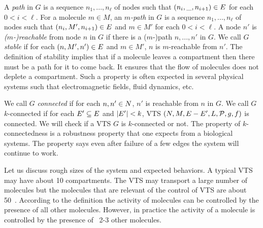 %

\vspace{0.2cm}
\noindent
A {\em path} in $G$ is a sequence $n_1,...,n_\ell$ of nodes 
such that $(n_i,\_,n_{i+1}) \in E$ for each $ 0 < i < \ell$.
%
For a molecule $m \in M$,
an {\em $m$-path} in $G$ is a sequence $n_1,...,n_\ell$ of nodes 
such that $(n_i,M',n_{i+1}) \in E$ and $m \in M'$ for
each $ 0 < i < \ell$.
%
A node $n'$ is {\em ($m$-)reachable} from node $n$ in $G$ if there is a ($m$-)path
$n,...,n'$ in $G$.
%
%
We call $G$ {\em stable} if for each $(n,M',n') \in E$ and $m \in M'$,
$n$ is $m$-reachable from $n'$.
%
The definition of stability implies that if a molecule leaves a
compartment then there must be a path for it to come back.
%
It ensures that the flow of molecules does not deplete a
compartment.
%
Such a property is often expected in several physical systems
such that electromagnetic fields, fluid dynamics, etc.

%
We call $G$ {\em connected} if for each $n,n' \in N$,
$n'$ is reachable from $n$ in $G$.
%
We call $G$ $k$-connected if for each $E' \subseteq E$ and
$|E'| < k$, VTS
$(N,M,E-E',L,\mathcal{P},g,f)$ is connected.
%
We will check if a VTS $G$ is $k$-connected or not.
%
The property of $k$-connectedness is a robustness property that one
expects from a biological systems.
%
The property says even after failure of a few edges the system will continue to work.

Let us discuss rough sizes of the system and expected behaviors.
%
A typical VTS may have about 10 compartments.
%
%
The VTS may transport a large number of molecules but the molecules that
are relevant of the control of VTS are about 50~\cite{kloepper2007elaborate}.
%
According to the definition the activity of molecules can be controlled by
the presence of all other molecules.
%
However, in practice the activity of a molecule is controlled by
the presence of ~2-3 other molecules.


